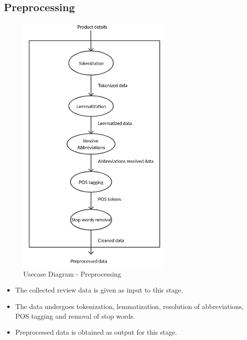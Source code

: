 \documentclass[11pt]{report}
\begin{document}
\subsection{Preprocessing}

\begin{figure}[H]
\centering
\includegraphics[scale=0.85]{images/preprocessing_usecase.png}
\caption{Usecase Diagram - Preprocessing}
\label{fig:usecase3}
\end{figure}

\begin{itemize}
\item The collected review data is given as input to this stage.
\item The data undergoes tokenization, lemmatization, resolution of abbreviations, POS tagging and removal of stop words.
\item Preprocessed data is obtained as output for this stage.
\end{itemize}
\end{document}
